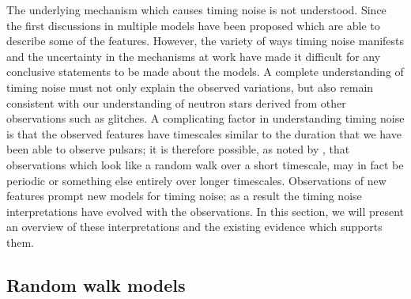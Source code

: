The underlying mechanism which causes timing noise is not understood. Since the
first discussions in \citet{Boynton1972} multiple models have been proposed
which are able to describe some of the features. However, the variety of ways
timing noise manifests and the uncertainty in the mechanisms at work have made
it difficult for any conclusive statements to be made about the models. A
complete understanding of timing noise must not only explain the observed
variations, but also remain consistent with our understanding of neutron stars
derived from other observations such as glitches. A complicating factor in
understanding timing noise is that the observed features have timescales
similar to the duration that we have been able to observe pulsars; it is
therefore possible, as noted by \citet{Hobbs2010}, that observations which look
like a random walk over a short timescale, may in fact be periodic or something
else entirely over longer timescales.  Observations of new features prompt new
models for timing noise; as a result the timing noise interpretations have
evolved with the observations. In this section, we will present an overview of
these interpretations and the existing evidence which supports them.

\subsection{Random walk models}
\label{sec: TN interpretations random walk models}

